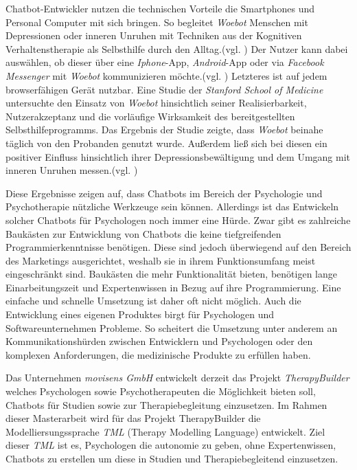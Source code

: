 Chatbot-Entwickler nutzen die technischen Vorteile die Smartphones und Personal Computer mit sich bringen. So begleitet \emph{Woebot} Menschen mit Depressionen oder inneren Unruhen mit Techniken aus der Kognitiven Verhaltenstherapie als Selbsthilfe durch den Alltag.(vgl. \cite{Fitzpatrick2017}) Der Nutzer kann dabei auswählen, ob dieser über eine \emph{Iphone}-App, \emph{Android}-App oder via \emph{Facebook Messenger} mit \emph{Woebot} kommunizieren möchte.(vgl. \cite{WoebotYo93:online}) Letzteres ist auf jedem browserfähigen Gerät nutzbar. Eine Studie der \emph{Stanford School of Medicine} untersuchte den Einsatz von \emph{Woebot} hinsichtlich seiner Realisierbarkeit, Nutzerakzeptanz und die vorläufige Wirksamkeit des bereitgestellten Selbsthilfeprogramms. Das Ergebnis der Studie zeigte, dass \emph{Woebot} beinahe täglich von den Probanden genutzt wurde. Außerdem ließ sich bei diesen ein positiver Einfluss hinsichtlich ihrer Depressionsbewältigung und dem Umgang mit inneren Unruhen messen.(vgl. \cite{Fitzpatrick2017})


Diese Ergebnisse zeigen auf, dass Chatbots im Bereich der Psychologie und Psychotherapie nützliche Werkzeuge sein können. Allerdings ist das Entwickeln solcher Chatbots für Psychologen noch immer eine Hürde. Zwar gibt es zahlreiche Baukästen zur Entwicklung von Chatbots die keine tiefgreifenden Programmierkenntnisse benötigen. Diese sind jedoch überwiegend auf den Bereich des Marketings ausgerichtet, weshalb sie in ihrem Funktionsumfang meist eingeschränkt sind. Baukästen die mehr Funktionalität bieten, benötigen lange Einarbeitungszeit und Expertenwissen in Bezug auf ihre Programmierung. Eine einfache und schnelle Umsetzung ist daher oft nicht möglich. Auch die Entwicklung eines eigenen Produktes birgt für Psychologen und Softwareunternehmen Probleme. So scheitert die Umsetzung unter anderem an Kommunikationshürden zwischen Entwicklern und Psychologen oder den komplexen Anforderungen, die medizinische Produkte zu erfüllen haben. 

Das Unternehmen \emph{movisens GmbH} entwickelt derzeit das Projekt \emph{TherapyBuilder} welches Psychologen sowie Psychotherapeuten die Möglichkeit bieten soll, Chatbots  für Studien sowie zur Therapiebegleitung einzusetzen. Im Rahmen dieser Masterarbeit wird für das Projekt TherapyBuilder die Modelliersungssprache \emph{TML} (Therapy Modelling Language) entwickelt. Ziel dieser \emph{TML} ist es, Psychologen die autonomie zu geben, ohne Expertenwissen, Chatbots zu erstellen um diese in Studien und Therapiebegleitend einzusetzen.



